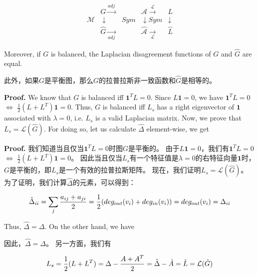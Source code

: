 \documentclass{article}
\begin{document}
\begin{equation}
    \begin{aligned}
                    &G \xrightarrow{adj}         &\mathcal{A} \xrightarrow{\mathcal{L}}          &L \\
        \mathcal{M} &\downarrow \quad\quad Sym   &\downarrow  Sym                      &\downarrow \\
                    &\hat{G} \xrightarrow[adj]{} &\hat{\mathcal{A}} \xrightarrow[\mathcal{L}]{}  &\hat{L} 
    \end{aligned}
    \tag{26}
    \label{26}
\end{equation}

{\color[gray]{0.5}
\noindent Moreover, if $G$ is balanced, the Laplacian disagreement functions of $G$ and $\hat{G}$ are equal.
}

\noindent 此外，如果$G$是平衡图，那么$G$的拉普拉斯非一致函数和$\hat{G}$是相等的。

{\color[gray]{0.5}
\noindent\textbf{Proof.} We know that $G$ is balanced iﬀ $\textbf{1}^TL=0$. 
Since $L\textbf{1}=0$, we have $\mathbf{1}^TL=0$ $\Leftrightarrow$ $\frac{1}{2}(L+L^T)\mathbf{1}=0$. 
Thus, $G$ is balanced iff $L_s$ has a right eigenvector of $\mathbf{1}$ associated with $\lambda=0$, i.e. $L_s$ is a valid Laplacian matrix.
Now, we prove that $L_s=\mathcal{L}(\hat{G})$. 
For doing so, let us calculate $\hat{\Delta}$ element-wise, we get
}

\noindent\textbf{Proof.} 我们知道当且仅当$\textbf{1}^TL=0$时图$G$是平衡的。
由于$L\textbf{1}=0$，我们有$\mathbf{1}^TL=0$ $\Leftrightarrow$ $\frac{1}{2}(L+L^T)\mathbf{1}=0$。
因此当且仅当$L_s$有一个特征值是$\lambda=0$的右特征向量$\mathbf{1}$时，$G$是平衡的，即$L_s$是一个有效的拉普拉斯矩阵。
现在，我们证明$L_s=\mathcal{L}(\hat{G})$。
为了证明，我们计算$\hat{\Delta}$的元素，可以得到：

\begin{equation}
    \hat{\Delta}_{ii}=\sum_j \frac{a_{ij}+a_{ji}}{2}=\frac{1}{2}(deg_{out}(v_i)+deg_{in}(v_i))=deg_{out}(v_i)=\Delta_{ii}
    \notag
\end{equation}

{\color[gray]{0.5}
\noindent Thus, $\hat{\Delta}=\Delta$. 
On the other hand, we have
}

\noindent 因此，$\hat{\Delta}=\Delta$。
另一方面，我们有

\begin{equation}
    L_s = \frac{1}{2}(L+L^T) = \Delta-\frac{A+A^T}{2}=\hat{\Delta}-\hat{A}=\hat{L}=\mathcal{L}(\hat{G})
    \notag
\end{equation}
\end{document}
